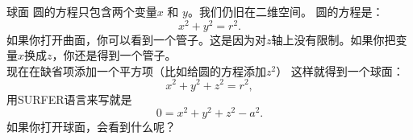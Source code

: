 ﻿\begin{surferPage}[球面]{球面}
圆的方程只包含两个变量$x$ 和 $y$。我们仍旧在二维空间。
圆的方程是：
\[x^2+y^2=r^2.\]
如果你打开曲面，你可以看到一个管子。这是因为对$z$轴上没有限制。如果你把变量$x$换成$z$，你还是得到一个管子。\\
现在在缺省项添加一个平方项（比如给圆的方程添加$z^2$）
这样就得到一个球面：
\[x^2+y^2+z^2=r^2,\]
用SURFER语言来写就是
\[0=x^2+y^2+z^2-a^2.\]
如果你打开球面，会看到什么呢？
\end{surferPage}


